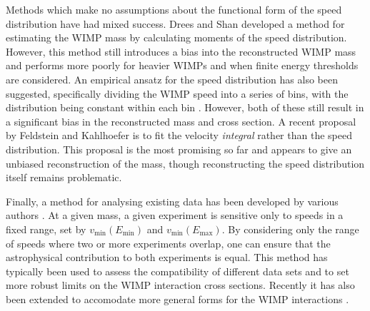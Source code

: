 Methods which make no assumptions about the functional form of the speed distribution have had mixed success. Drees and Shan \cite{Drees:2007, Drees:2008} developed a method for estimating the WIMP mass by calculating moments of the speed distribution. However, this method still introduces a bias into the reconstructed WIMP mass and performs more poorly for heavier WIMPs and when finite energy thresholds are considered. An empirical ansatz for the speed distribution has also been suggested, specifically dividing the WIMP speed into a series of bins, with the distribution being constant within each bin \cite{Peter:2011}. However, both of these still result in a significant bias in the reconstructed mass and cross section. A recent proposal by Feldstein and Kahlhoefer \cite{Feldstein:2014} is to fit the velocity \textit{integral} rather than the speed distribution. This proposal is the most promising so far and appears to give an unbiased reconstruction of the mass, though reconstructing the speed distribution itself remains problematic.

Finally, a method for analysing existing data has been developed by various authors \cite{Fox:2011b,Frandsen:2012, Gondolo:2012}. At a given mass, a given experiment is sensitive only to speeds in a fixed range, set by $v_\textrm{min}(E_\textrm{min})$ and $v_\textrm{min}(E_\textrm{max})$. By considering only the range of speeds where two or more experiments overlap, one can ensure that the astrophysical contribution to both experiments is equal. This method has typically been used to assess the compatibility of different data sets and to set more robust limits on the WIMP interaction cross sections. Recently it has also been extended to accomodate more general forms for the WIMP interactions \cite{DelNobile:2013}. 

